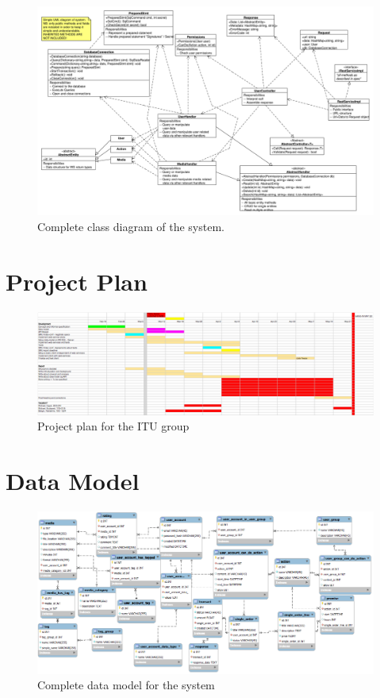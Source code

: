 \documentclass[11pt]{article}
\begin{document}
\begin{figure}[h!]
  \caption{Complete class diagram of the system.}
  \centering
    \includegraphics[width=1\textwidth, angle=270]{diagrams/class_diagram.jpg}
\end{figure}

\newpage

\section{Project Plan}

\begin{figure}[h!]
  \caption{Project plan for the ITU group}
  \centering
    \includegraphics[width=1\textwidth, angle=270]{images/project_plan.png}
\end{figure}

\newpage

\section{Data Model}

\begin{figure}[h!]
  \caption{Complete data model for the system}
  \centering
    \includegraphics[width=1\textwidth, angle=270]{images/data_model.png}
\end{figure}
\end{document}
